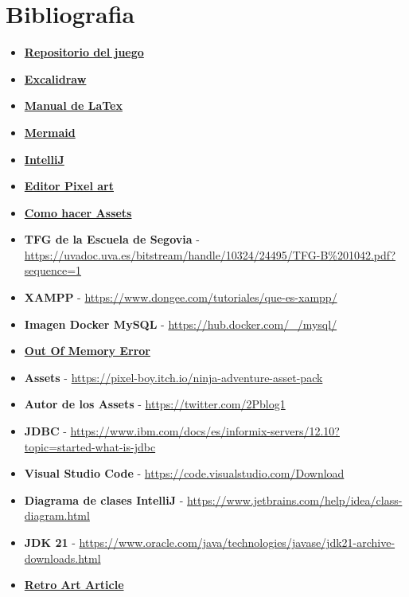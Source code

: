 \documentclass[a4paper]{article}
\begin{document}
\section{Bibliografia}
\begin{itemize}
    \item \textbf{\href{https://github.com/Pisa-17/TFG-DAM-Eldoria/tree/main}{Repositorio del juego}}
    \item \textbf{\href{https://excalidraw.com/}{Excalidraw}}
    \item \textbf{\href{https://manualdelatex.com/}{Manual de LaTex}}
    \item \textbf{\href{https://mermaid.js.org/intro/getting-started.html}{Mermaid}}
    \item \textbf{\href{https://www.jetbrains.com/es-es/idea/}{IntelliJ}} 
    \item \textbf{\href{https://www.piskelapp.com/}{Editor Pixel art}}
    \item \textbf{\href{https://tips.clip-studio.com/es-es/articles/2484}{Como hacer Assets}}
    \item \textbf{TFG de la Escuela de Segovia} - \url{https://uvadoc.uva.es/bitstream/handle/10324/24495/TFG-B%201042.pdf?sequence=1}
    \item \textbf{XAMPP} - \url{https://www.dongee.com/tutoriales/que-es-xampp/}
    \item \textbf{Imagen Docker MySQL} - \url{https://hub.docker.com/_/mysql/}
    \item \textbf{\href{https://stackoverflow.com/questions/1596009/java-lang-outofmemoryerror-java-heap-space}{Out Of Memory Error}}
    \item \textbf{Assets} - \url{https://pixel-boy.itch.io/ninja-adventure-asset-pack}
    \item \textbf{Autor de los Assets} - \url{https://twitter.com/2Pblog1}
    \item \textbf{JDBC} - \url{https://www.ibm.com/docs/es/informix-servers/12.10?topic=started-what-is-jdbc}
    \item \textbf{Visual Studio Code} - \url{https://code.visualstudio.com/Download}
    \item \textbf{Diagrama de clases IntelliJ} - \url{https://www.jetbrains.com/help/idea/class-diagram.html}
    \item \textbf{JDK 21} - \url{https://www.oracle.com/java/technologies/javase/jdk21-archive-downloads.html}
    \item \textbf{\href{https://medium.com/@dq_irfandi/the-nostalgia-effect-how-retro-games-influence-modern-gaming-8925be77694e}{Retro Art Article}}

\end{itemize}
\end{document}
